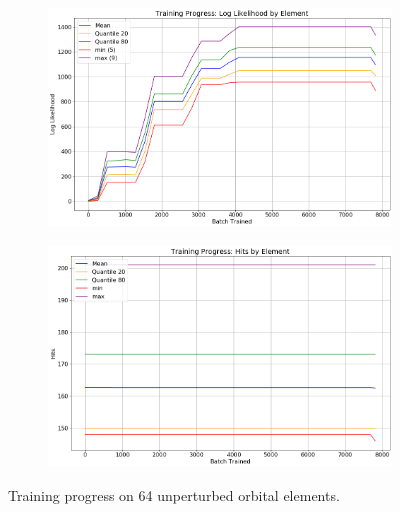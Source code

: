 \begin{figure}[h]
\begin{subfigure}[t]{\subfigwidth\textwidth}
\centering
\includegraphics[width=\linewidth]{../figs/search_known/unperturbed/learning_curve_log_like.png}
\end{subfigure}
\hfill
\begin{subfigure}[t]{\subfigwidth\textwidth}
\centering
\includegraphics[width=\linewidth]{../figs/search_known/unperturbed/learning_curve_hits.png}
\end{subfigure}
\caption[Training progress on 64 unperturbed orbital elements]
{Training progress on 64 unperturbed orbital elements.}
\label{fig:TrainUnperturbed}
\end{figure}
